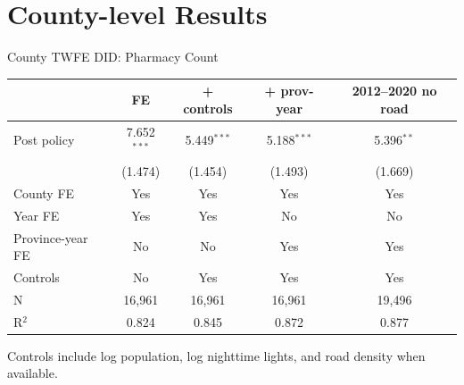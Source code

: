 \documentclass{beamer}
\begin{document}

\section{County-level Results}

\begin{frame}{County TWFE DID: Pharmacy Count}

\centering
\scriptsize
\setlength{\tabcolsep}{4pt}

\begin{tabular}{lcccc}
\toprule
& FE & + controls & + prov-year & 2012--2020 no road \\
\midrule
Post policy
& 7.652$^{***}$ & 5.449$^{***}$ & 5.188$^{***}$ & 5.396$^{**}$ \\
& (1.474) & (1.454) & (1.493) & (1.669) \\
\midrule
County FE & Yes & Yes & Yes & Yes \\
Year FE & Yes & Yes & No & No \\
Province-year FE & No & No & Yes & Yes \\
Controls & No & Yes & Yes & Yes \\
\midrule
N & 16,961 & 16,961 & 16,961 & 19,496 \\
R$^2$ & 0.824 & 0.845 & 0.872 & 0.877 \\
\bottomrule
\end{tabular}

\vspace{0.4em}
\raggedright
\tiny Controls include log population, log nighttime lights, and road density when available.

\end{frame}
\end{document}

